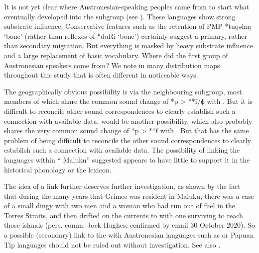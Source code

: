 It is not yet clear where Austronesian-speaking peoples came
from to start what eventually developed into the  subgroup (see ).
These languages show strong substrate influence.
Conservative features such as the retention of PMP *tuqəlaŋ ‘bone’
(rather than reflexes of *duRi ‘bone’) certainly suggest a primary,
rather than secondary migration.
But everything is masked by heavy substrate influence
and a large replacement of basic vocabulary.
Where did the first group of Austronesian speakers come from?
We note in many distribution maps throughout this study that
 is often different in noticeable ways.

The geographically obvious possibility is via the neighbouring
 subgroup, most members of which share the common sound change of *p > **f/ɸ with .
But it is difficult to reconcile other sound correspondences
to clearly establish such a connection with available data.
 would be another possibility,
which also probably shares the very common sound change of *p
> **f with .
But that has the same problem of being difficult to reconcile
the other sound correspondences to clearly establish such a connection with available data.
The possibility of linking the  languages within “
Maluku” suggested \citet{GrayGreenhill2009} appears to have little to support it in the historical
phonology or the lexicon.

The idea of a link further  deserves further investigation,
as shown by the fact that during the many years that Grimes was
resident in Maluku, there was a case of a small dingy with two men
and a woman who had run out of fuel in the Torres Straits,
and then drifted on the currents to  with one surviving to
reach those islands (pers. comm.
Jock Hughes, confirmed by email 30 October 2020).
So a possible (secondary) link to the  with Austronesian
languages such as  or Papuan Tip languages should not be
ruled out without investigation. See also \citet{Voorhoeve1982}.